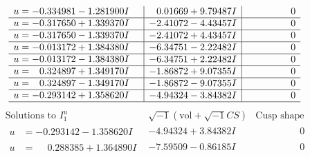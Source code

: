 \documentclass[1p]{elsarticle_modified}
\theoremstyle{definition}
\newcommand{\I}{\sqrt{-1}}
\begin{document}
$$\begin{array}{c|c|c}
\begin{aligned}
u &= -0.334981 - 1.281900 I\end{aligned}
 & \phantom{-}0.01669 + 9.79487 I & \phantom{-0.000000 } 0 \\ \hline\begin{aligned}
u &= -0.317650 + 1.339370 I\end{aligned}
 & -2.41072 - 4.43457 I & \phantom{-0.000000 } 0 \\ \hline\begin{aligned}
u &= -0.317650 - 1.339370 I\end{aligned}
 & -2.41072 + 4.43457 I & \phantom{-0.000000 } 0 \\ \hline\begin{aligned}
u &= -0.013172 + 1.384380 I\end{aligned}
 & -6.34751 - 2.22482 I & \phantom{-0.000000 } 0 \\ \hline\begin{aligned}
u &= -0.013172 - 1.384380 I\end{aligned}
 & -6.34751 + 2.22482 I & \phantom{-0.000000 } 0 \\ \hline\begin{aligned}
u &= \phantom{-}0.324897 + 1.349170 I\end{aligned}
 & -1.86872 + 9.07355 I & \phantom{-0.000000 } 0 \\ \hline\begin{aligned}
u &= \phantom{-}0.324897 - 1.349170 I\end{aligned}
 & -1.86872 - 9.07355 I & \phantom{-0.000000 } 0 \\ \hline\begin{aligned}
u &= -0.293142 + 1.358620 I\end{aligned}
 & -4.94324 - 3.84382 I & \phantom{-0.000000 } 0\\
 \hline 
 \end{array}$$\newpage$$\begin{array}{c|c|c}  
\text{Solutions to }I^u_{1}& \I (\text{vol} + \sqrt{-1}CS) & \text{Cusp shape}\\
 \hline 
\begin{aligned}
u &= -0.293142 - 1.358620 I\end{aligned}
 & -4.94324 + 3.84382 I & \phantom{-0.000000 } 0 \\ \hline\begin{aligned}
u &= \phantom{-}0.288385 + 1.364890 I\end{aligned}
 & -7.59509 - 0.86185 I & \phantom{-0.000000 } 0 \\ \hline\begin{aligned}

\end{aligned}
\end{array}$$
\end{document}
